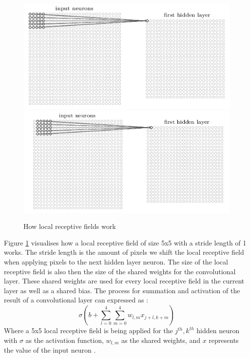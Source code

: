 \documentclass[10pt]{article}
\begin{document}
		\begin{figure}[h]				
			\includegraphics[scale=0.55]{img/convNet1}
			\includegraphics[scale=0.55]{img/convNet2}
			\centering
			\caption{How local receptive fields work \cite{nndl}}
			\label{fig:lrf}
		\end{figure}
		Figure \ref{fig:lrf} visualises how a local receptive field of size 5x5 with a stride length of 1 works. The stride length is the amount of pixels we shift the local receptive field when applying pixels to the next hidden layer neuron. The size of the local receptive field is also then the size of the shared weights for the convolutional layer. These shared weights are used for every local receptive field in the current layer as well as a shared bias. The process for summation and activation of the result of a convolutional layer can expressed as \cite{nndl}:
		\begin{equation}
			\sigma (b + \sum^4_{l=0} \sum^4_{m=0} w_{l, m} x_{j+l, k+m})
		\end{equation}
		Where a 5x5 local receptive field is being applied for the $j^{th}, k^{th}$ hidden neuron with $\sigma$ as the activation function, $w_{l, m}$ as the shared weights, and $x$ represents the value of the input neuron \cite{nndl}.\\
		
\end{document}
